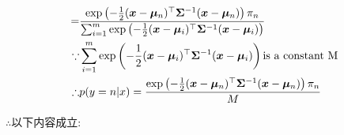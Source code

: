 \documentclass[answers]{exam}  %
\begin{document}
\begin{questions}
\begin{solution}
\begin{enumerate}
\begin{align*}
				      =          & \frac{\exp\left(-\frac{1}{2}({\boldsymbol{x}}-\boldsymbol{\mu}_n)^\top\boldsymbol{\Sigma}^{-1}({\boldsymbol{x}}-\boldsymbol{\mu}_n)\right)\pi_{n}}{\sum_{i=1}^{m}\exp\left(-\frac{1}{2}({\boldsymbol{x}}-\boldsymbol{\mu}_i)^\top\boldsymbol{\Sigma}^{-1}({\boldsymbol{x}}-\boldsymbol{\mu}_i)\right)}                                                                                                                                         \\
				      \because   & \sum_{i=1}^{m}\exp\left(-\frac{1}{2}({\boldsymbol{x}}-\boldsymbol{\mu}_i)^\top\boldsymbol{\Sigma}^{-1}({\boldsymbol{x}}-\boldsymbol{\mu}_i)\right)\text{is a constant M}                                                                                                                                                                                                         \\
				      \therefore & p(y=n|x)=\frac{\exp\left(-\frac{1}{2}({\boldsymbol{x}}-\boldsymbol{\mu}_n)^\top\boldsymbol{\Sigma}^{-1}({\boldsymbol{x}}-\boldsymbol{\mu}_n)\right)\pi_{n}}{M}
			      \end{align*}

			      $\therefore $以下内容成立:


\end{enumerate}
\end{solution}
\end{questions}
\end{document}
